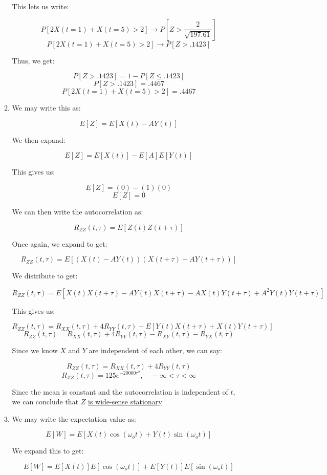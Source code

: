 \begin{enumerate}
\begin{enumerate}
        This lets us write:

        $$P[2X(t=1)+X(t=5)>2]\to P\left[Z>\frac{2}{\sqrt{197.61}}\right]$$
        $$P[2X(t=1)+X(t=5)>2]\to P\left[Z>.1423\right]$$

        Thus, we get:

        $$P[Z>.1423]=1-P[Z\leq.1423]$$
        $$P[Z>.1423]=.4467$$
        $$\boxed{P[2X(t=1)+X(t=5)>2]=.4467}$$

      \item We may write this as:

        $$E[Z]=E[X(t)-AY(t)]$$

        We then expand:

        $$E[Z]=E[X(t)]-E[A]E[Y(t)]$$

        This gives us:

        $$E[Z]=(0)-(1)(0)$$
        $$\boxed{E[Z]=0}$$

        We can then write the autocorrelation as:

        $$R_{ZZ}(t,\tau)=E[Z(t)Z(t+\tau)]$$

        Once again, we expand to get:

        $$R_{ZZ}(t,\tau)=E[(X(t)-AY(t))(X(t+\tau)-AY(t+\tau))]$$

        We distribute to get:

        $$R_{ZZ}(t,\tau)=E[X(t)X(t+\tau)-AY(t)X(t+\tau)-AX(t)Y(t+\tau)+A^2Y(t)Y(t+\tau)]$$

        This gives us:

        $$R_{ZZ}(t,\tau)=R_{XX}(t,\tau)+4R_{YY}(t,\tau)-E[Y(t)X(t+\tau)+X(t)Y(t+\tau)]$$
        $$R_{ZZ}(t,\tau)=R_{XX}(t,\tau)+4R_{YY}(t,\tau)-R_{XY}(t,\tau)-R_{YX}(t,\tau)$$

        Since we know $X$ and $Y$ are independent of each other, we can say:

        $$R_{ZZ}(t,\tau)=R_{XX}(t,\tau)+4R_{YY}(t,\tau)$$
        $$\boxed{R_{ZZ}(t,\tau)=125e^{-20000\tau^2},\quad -\infty<\tau<\infty}$$

        Since the mean is constant and the autocorrelation is independent of $t$, we can conclude that $Z$ \underline{is wide-sense stationary}

      \item We may write the expectation value as:

        $$E[W]=E[X(t)\cos(\omega_ot)+Y(t)\sin(\omega_ot)]$$

        We expand this to get:

        $$E[W]=E[X(t)]E[\cos(\omega_ot)]+E[Y(t)]E[\sin(\omega_ot)]$$


\end{enumerate}
\end{enumerate}
